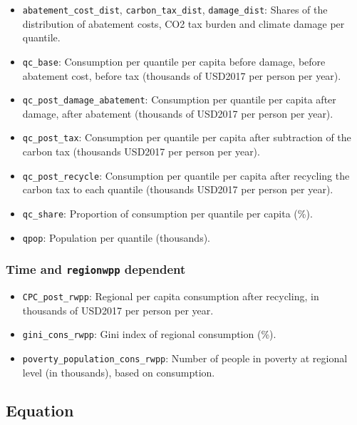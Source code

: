 \documentclass[
]{article}
\providecommand{\tightlist}{%
  \setlength{\itemsep}{0pt}\setlength{\parskip}{0pt}}
\begin{document}
\begin{itemize}
\tightlist
\item
  \texttt{abatement\_cost\_dist}, \texttt{carbon\_tax\_dist},
  \texttt{damage\_dist}: Shares of the distribution of abatement costs,
  CO2 tax burden and climate damage per quantile.
\item
  \texttt{qc\_base}: Consumption per quantile per capita before damage, before
  abatement cost, before tax (thousands of USD2017 per person per year).
\item
  \texttt{qc\_post\_damage\_abatement}: Consumption per quantile per capita after damage, after
  abatement (thousands of
  USD2017 per person per year).
\item
  \texttt{qc\_post\_tax}: Consumption per quantile per capita after
  subtraction of the carbon tax (thousands USD2017 per person per year).
\item
  \texttt{qc\_post\_recycle}: Consumption per quantile per capita after
  recycling the carbon tax to each quantile (thousands USD2017 per
  person per year).
\item
  \texttt{qc\_share}: Proportion of consumption per quantile per capita
  (\%).
\item
  \texttt{qpop}: Population per quantile (thousands).
\end{itemize}

\subsubsection{\texorpdfstring{Time and \texttt{regionwpp}
dependent}{Time and regionwpp dependent}}\label{time-and-regionwpp-dependent}

\begin{itemize}
\tightlist
\item
  \texttt{CPC\_post\_rwpp}: Regional per capita consumption after
  recycling, in thousands of USD2017 per person per year.
\item
  \texttt{gini\_cons\_rwpp}: Gini index of regional consumption (\%).
\item
  \texttt{poverty\_population\_cons\_rwpp}: Number of people in poverty
  at regional level (in thousands), based on consumption.
\end{itemize}

\subsection{Equation}\label{equation-1}
\end{document}
